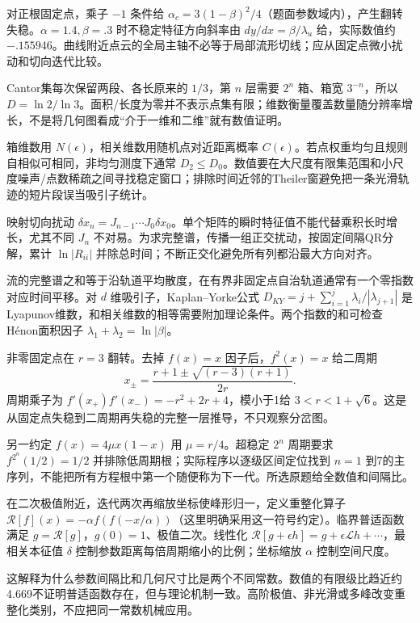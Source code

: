 对正根固定点，乘子 $-1$ 条件给 $\alpha_c=3(1-\beta)^2/4$（题面参数域内），产生翻转失稳。$\alpha=1.4,\beta=.3$ 时不稳定特征方向斜率由 $dy/dx=\beta/\lambda_u$ 给，实际数值约 $-.155946$。曲线附近点云的全局主轴不必等于局部流形切线；应从固定点微小扰动和切向迭代比较。

Cantor集每次保留两段、各长原来的 $1/3$，第 $n$ 层需要 $2^n$ 箱、箱宽 $3^{-n}$，所以 $D=\ln2/\ln3$。面积/长度为零并不表示点集有限；维数衡量覆盖数量随分辨率增长，不是将几何图看成“介于一维和二维”就有数值证明。

箱维数用 $N(\epsilon)$，相关维数用随机点对近距离概率 $C(\epsilon)$。若点权重均匀且规则自相似可相同，非均匀测度下通常 $D_2\le D_0$。数值要在大尺度有限集范围和小尺度噪声/点数稀疏之间寻找稳定窗口；排除时间近邻的Theiler窗避免把一条光滑轨迹的短片段误当吸引子统计。

映射切向扰动 $\delta x_n=J_{n-1}\cdots J_0\delta x_0$。单个矩阵的瞬时特征值不能代替乘积长时增长，尤其不同 $J_n$ 不对易。为求完整谱，传播一组正交扰动，按固定间隔QR分解，累计 $\ln|R_{ii}|$ 并除总时间；不断正交化避免所有列都沿最大方向对齐。

流的完整谱之和等于沿轨道平均散度，在有界非固定点自治轨道通常有一个零指数对应时间平移。对 $d$ 维吸引子，Kaplan--Yorke公式 $D_{KY}=j+\sum_{i=1}^j\lambda_i/|\lambda_{j+1}|$ 是Lyapunov维数，和相关维数的相等需要附加理论条件。两个指数的和可检查H\'enon面积因子 $\lambda_1+\lambda_2=\ln|\beta|$。

非零固定点在 $r=3$ 翻转。去掉 $f(x)=x$ 因子后，$f^2(x)=x$ 给二周期
\[
x_\pm=\frac{r+1\pm\sqrt{(r-3)(r+1)}}{2r}.
\]
周期乘子为 $f'(x_+)f'(x_-)=-r^2+2r+4$，模小于1给 $3<r<1+\sqrt6$。这是从固定点失稳到二周期再失稳的完整一层推导，不只观察分岔图。

另一约定 $f(x)=4\mu x(1-x)$ 用 $\mu=r/4$。超稳定 $2^n$ 周期要求 $f^{2^n}(1/2)=1/2$ 并排除低周期根；实际程序以逐级区间定位找到 $n=1$ 到7的主序列，不能把所有方程根中第一个随便称为下一代。所选原题给全数值和间隔比。

在二次极值附近，迭代两次再缩放坐标使峰形归一，定义重整化算子 $\mathcal R[f](x)=-\alpha f(f(-x/\alpha))$（这里明确采用这一符号约定）。临界普适函数满足 $g=\mathcal R[g]$，$g(0)=1$、极值二次。线性化 $\mathcal R[g+\epsilon h]=g+\epsilon\mathcal Lh+\cdots$，最相关本征值 $\delta$ 控制参数距离每倍周期缩小的比例；坐标缩放 $\alpha$ 控制空间尺度。

这解释为什么参数间隔比和几何尺寸比是两个不同常数。数值的有限级比趋近约4.669不证明普适函数存在，但与理论机制一致。高阶极值、非光滑或多峰改变重整化类别，不应把同一常数机械应用。

